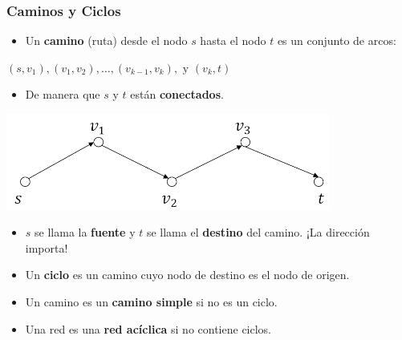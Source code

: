 \documentclass{beamer}
\begin{document}
\begin{frame}
    \frametitle{Caminos y Ciclos}
    
    \begin{itemize}
        \item Un \textbf{camino} (ruta) desde el nodo $s$ hasta el nodo $t$ es un conjunto de arcos:
    \end{itemize}
    
    \begin{center}
        $(s,v_1), (v_1,v_2), \dots, (v_{k-1},v_k), \text{ y } (v_k,t)$
    \end{center}
    
    \begin{itemize}
        \item De manera que $s$ y $t$ están \textbf{conectados}.
    \end{itemize}
    \vspace{-.5cm}
    \begin{center}
        \includegraphics[width=0.8\textwidth]{images/path_cycle_graph.png} %
    \end{center}
    \vspace{-.5cm}
    \begin{itemize}
        \item $s$ se llama la \textbf{fuente} y $t$ se llama el \textbf{destino} del camino. ¡La dirección importa!
        \item Un \textbf{ciclo} es un camino cuyo nodo de destino es el nodo de origen.
        \item Un camino es un \textbf{camino simple} si no es un ciclo.
        \item Una red es una \textbf{red acíclica} si no contiene ciclos.
    \end{itemize}

\end{frame}
\end{document}
